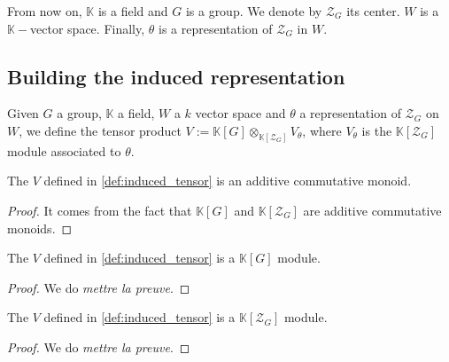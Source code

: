 From now on, $\mathbb{K}$ is a field and $G$ is a group. We denote by
$\mathcal{Z}_G$ its center. $W$ is a $\mathbb{K}-$vector space. Finally,
$\theta$ is a representation of $\mathcal{Z}_G$ in $W$.

\subsection{Building the induced representation}

\begin{definition}
    \label{def:induced_tensor}
    \leanok
    Given $G$ a group, $\mathbb{K}$ a field, $W$ a $k$ vector space and $\theta$ a representation of
    $\mathcal{Z}_G$ on $W$, we define the tensor product $V:=\mathbb{K}[G]\otimes_{\mathbb{K}[\mathcal{Z}_G]}V_\theta$,
    where $V_\theta$ is the $\mathbb{K}[\mathcal{Z}_G]$ module associated to $\theta$.
\end{definition}

\begin{proposition}
    \label{prop:induced_add_comm_mono}
    \leanok 
    The $V$ defined in \ref{def:induced_tensor} is an additive commutative monoid.
\end{proposition}
\begin{proof}
    \leanok
    It comes from the fact that $\mathbb{K}[G]$ and $\mathbb{K}[\mathcal{Z}_G]$ are
    additive commutative monoids.
\end{proof}

\begin{proposition}
    \label{prop:tensor_module_mono}
    \leanok 
    The $V$ defined in \ref{def:induced_tensor} is a $\mathbb{K}[G]$ module.
\end{proposition}
\begin{proof}
    \leanok
    We do \textit{mettre la preuve}.
\end{proof}

\begin{proposition}
    \label{prop:tensor_module_sub}
    \leanok 
    The $V$ defined in \ref{def:induced_tensor} is a $\mathbb{K}[\mathcal{Z}_G]$ module.
\end{proposition}
\begin{proof}
    \leanok
    We do \textit{mettre la preuve}.
\end{proof}

